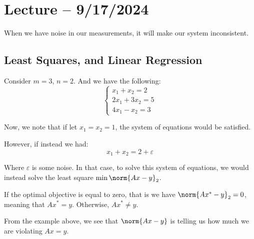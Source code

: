 \documentclass[openany]{book}
\begin{document}
\section{Lecture -- 9/17/2024}
When we have noise in our measurements, it will make our system inconsistent.

\subsection{Least Squares, and Linear Regression}
\begin{example}
	Consider $m = 3$, $n = 2$. And we have the following:
	\begin{equation*}
		\begin{cases}
			x_1 + x_2 = 2 \\
			2x_1 + 3x_2 = 5 \\
			4x_1 - x_2 = 3
		\end{cases}
	\end{equation*}

	Now, we note that if let $x_1 = x_2 = 1$, the system of equations would be satisfied.
	
	However, if instead we had:
	\begin{equation*}
		x_1 + x_2 = 2 + \varepsilon
	\end{equation*}

	Where $\varepsilon$ is some noise. In that case, to solve this system of equations, we would instead solve the least square $\min \norm{Ax - y}_2$.
	
	If the optimal objective is equal to zero, that is we have $\norm{Ax^{*} - y}_2 = 0$, meaning that $Ax^{*} = y$. Otherwise, $Ax^{*} \neq y$.
\end{example}

From the example above, we see that $\norm{Ax - y}$ is telling us how much we are violating $Ax = y$.
\end{document}

